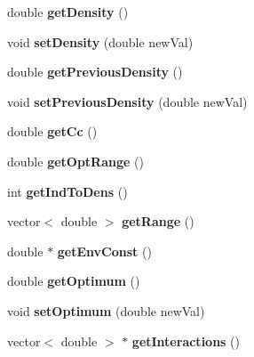 \begin{DoxyCompactItemize}
\item 
\mbox{\label{classSpecies_acb9612a527b867219571604e06a9b96a}} 
double {\bfseries get\+Density} ()
\item 
\mbox{\label{classSpecies_a638225fa251d88eb8fefe25575791df9}} 
void {\bfseries set\+Density} (double new\+Val)
\item 
\mbox{\label{classSpecies_a674fddbf5e26a31280c9d0a8e423af47}} 
double {\bfseries get\+Previous\+Density} ()
\item 
\mbox{\label{classSpecies_a762477a6c0f86748638a8cb41c677c84}} 
void {\bfseries set\+Previous\+Density} (double new\+Val)
\item 
\mbox{\label{classSpecies_abe2828fd01669eac6359b1fb30d02f96}} 
double {\bfseries get\+Cc} ()
\item 
\mbox{\label{classSpecies_a5f2ab7671a625cc25bbfee399b4a388a}} 
double {\bfseries get\+Opt\+Range} ()
\item 
\mbox{\label{classSpecies_aa7f142ce10d699c3e222aed1e9527153}} 
int {\bfseries get\+Ind\+To\+Dens} ()
\item 
\mbox{\label{classSpecies_a972f259afd0683125f29ab396afe7b90}} 
vector$<$ double $>$ {\bfseries get\+Range} ()
\item 
\mbox{\label{classSpecies_af1cfadceaecbb1c27134638d56a2da79}} 
double $\ast$ {\bfseries get\+Env\+Const} ()
\item 
\mbox{\label{classSpecies_a77083a8913e501f92abfdfdc0b376249}} 
double {\bfseries get\+Optimum} ()
\item 
\mbox{\label{classSpecies_ad800e8f89d4ea0b68644d58ba4796d88}} 
void {\bfseries set\+Optimum} (double new\+Val)
\item 
\mbox{\label{classSpecies_a0f1fb546bb844fbeb9486888bddfd666}} 
vector$<$ double $>$ $\ast$ {\bfseries get\+Interactions} ()
\item 

\end{DoxyCompactItemize}
